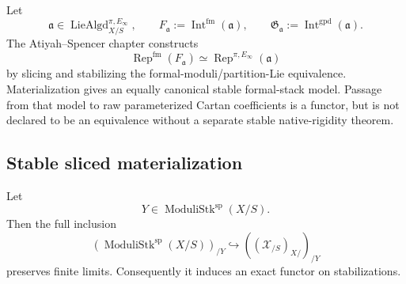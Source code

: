 Let
\[
    \mathfrak a\in
    \operatorname{LieAlgd}^{\pi,E_\infty}_{X/S},
    \qquad
    F_{\mathfrak a}:=\operatorname{Int}^{\mathrm{fm}}(\mathfrak a),
    \qquad
    \mathfrak G_{\mathfrak a}
    :=\operatorname{Int}^{\mathrm{gpd}}(\mathfrak a).
\]
The Atiyah--Spencer chapter constructs
\[
    \operatorname{Rep}^{\mathrm{fm}}(F_{\mathfrak a})
    \simeq
    \operatorname{Rep}^{\pi,E_\infty}(\mathfrak a)
\]
by slicing and stabilizing the formal-moduli/partition-Lie equivalence.
Materialization gives an equally canonical stable formal-stack model.  Passage
from that model to raw parameterized Cartan coefficients is a functor, but is
not declared to be an equivalence without a separate stable native-rigidity
theorem.

\subsection{Stable sliced materialization}

\begin{proposition}
\label{prop:bnli-relative-formal-stack-slice}
Let
\[
    Y\in\operatorname{ModuliStk}^{\mathrm{sp}}(X/S).
\]
Then the full inclusion
\[
\boxed{
    \left(
      \operatorname{ModuliStk}^{\mathrm{sp}}(X/S)
    \right)_{/Y}
    \hookrightarrow
    \left(
      (\mathcal X_{/S})_{X/}
    \right)_{/Y}}
\]
preserves finite limits.  Consequently it induces an exact functor on
stabilizations.
\end{proposition}

